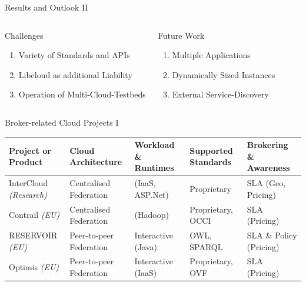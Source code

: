 \documentclass{beamer}
\newcommand{\ra}[1]{\renewcommand{\arraystretch}{#1}}
\begin{document}
\begin{frame}{Results and Outlook II}
\vspace{2cm}
\begin{columns}
\begin{alertblock}{Challenges}
	\begin{enumerate}
		\item Variety of Standards and APIs
		\item Libcloud as additional Liability
		\item Operation of Multi-Cloud-Testbeds
	\end{enumerate}
\end{alertblock}
\pause
\begin{block}{Future Work}
	\begin{enumerate}
		\item Multiple Applications
		\item Dynamically Sized Instances
		\item External Service-Discovery
	\end{enumerate}
\end{block}
\end{columns}
\end{frame}


\begin{frame}{Broker-related Cloud Projects I}
	\ra{1.3}%
	\begin{tabularx}{\textwidth}{LLLLL}%
		\toprule%
		Project or \newline Product & Cloud Architecture & Workload \& Runtimes & Supported Standards & Brokering \& Awareness\\%
		\midrule%
		InterCloud \emph{(Research)} & Centralised Federation & (IaaS, ASP.Net) & Proprietary  & SLA (Geo, Pricing)\\
		Contrail \newline \emph{(EU)} & Centralised Federation & (Hadoop) & Proprietary, OCCI & SLA (Pricing)\\%
		RESERVOIR \newline \emph{(EU)} & Peer-to-peer Federation & Interactive (Java) & OWL, SPARQL & SLA \& Policy (Pricing)\\%
		Optimis \newline \emph{(EU)} & Peer-to-peer Federation & Interactive (IaaS) & Proprietary, OVF & SLA (Pricing)\\%
	\end{tabularx}
\end{frame}
\end{document}
